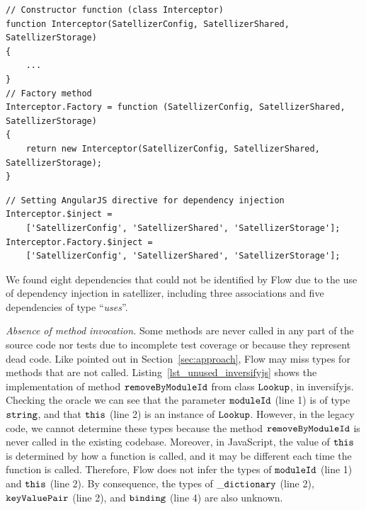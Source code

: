\documentclass[review]{elsarticle}
\newcommand{\aspas}[1]{{``#1''}}
\newcommand{\mcode}[1]{$\tt #1$}
\newcommand{\ab}[1]{\nb{Alexandre}{blue}{#1}}
\begin{document}
\vspace{0.3cm}
\begin{lstlisting}[caption=Factory method for class \mcode{Interceptor} in {\sc satellizer}, label=lst_factory_angularjs_satellizer, emph={[2]$inject},emphstyle={[2]\ttfamily\bfseries\color{darkgreen}}]
// Constructor function (class Interceptor)
function Interceptor(SatellizerConfig, SatellizerShared, SatellizerStorage) 
{
	...
}
// Factory method
Interceptor.Factory = function (SatellizerConfig, SatellizerShared, SatellizerStorage) 
{
	return new Interceptor(SatellizerConfig, SatellizerShared, SatellizerStorage);
}

\end{lstlisting} 


\begin{lstlisting}[caption=Setting dependency injection directives in {\sc satellizer}, label=lst_di_angularjs_satellizer, emph={[2]$inject},emphstyle={[2]\ttfamily\bfseries\color{darkgreen}}]
// Setting AngularJS directive for dependency injection
Interceptor.$inject = 
	['SatellizerConfig', 'SatellizerShared', 'SatellizerStorage'];
Interceptor.Factory.$inject = 
	['SatellizerConfig', 'SatellizerShared', 'SatellizerStorage'];

\end{lstlisting} 

We found eight dependencies that could not be identified by Flow due to the use of dependency injection in {\sc satellizer}, including three associations and five dependencies of type \aspas{\textit{uses}}.

\vspace{0.3cm}

\noindent \textit{Absence of method invocation.} Some methods are never called in any part of the source code nor tests due to incomplete test coverage or because they represent dead code. Like pointed out in Section~\ref{sec:approach}, Flow may miss types for methods that are not called. Listing~\ref{lst_unused_inversifyjs} shows the implementation of method \mcode{removeByModuleId} from class \mcode{Lookup}, in {\sc inversifyjs}. Checking the oracle we can see that the parameter \mcode{moduleId} (line 1) is of type \mcode{string}, and that \mcode{this} (line 2) is an instance of \mcode{Lookup}. However, in the legacy code, we cannot determine these types because the method \mcode{removeByModuleId} is never called in the existing codebase. Moreover, in JavaScript, the value of \mcode{this} is determined by how a function is called, and it may be different each time the function is called. Therefore, Flow does not infer the types of \mcode{moduleId} (line 1) and \mcode{this} (line 2). By consequence, the types of \mcode{\_dictionary} (line 2), \mcode{keyValuePair} (line 2), and \mcode{binding} (line 4) are also unknown.
\end{document}

